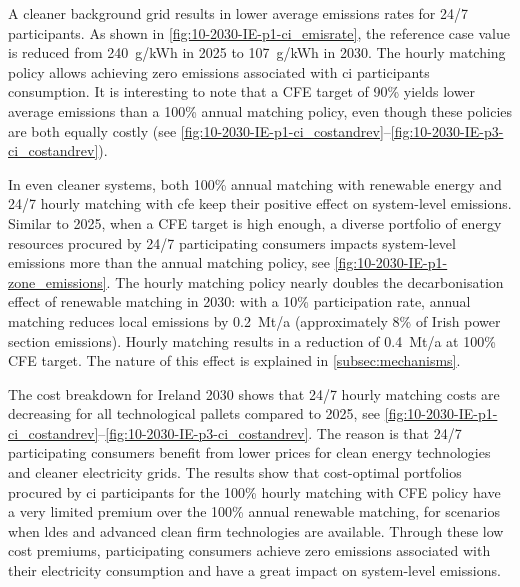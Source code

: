 A cleaner background grid results in lower average emissions rates for 24/7 participants. 
As shown in \cref{fig:10-2030-IE-p1-ci_emisrate}, the reference case value is reduced from 240~g\co/kWh in 2025 to 107~g\co/kWh in 2030.
The hourly matching policy allows achieving zero emissions associated with \gls{ci} participants consumption.
It is interesting to note that a CFE target of 90\% yields lower average emissions than a 100\% annual matching policy, even though these policies are both equally costly (see \cref{fig:10-2030-IE-p1-ci_costandrev}--\cref{fig:10-2030-IE-p3-ci_costandrev}).

In even cleaner systems, both 100\% annual matching with renewable energy and 24/7 hourly matching with \gls{cfe} keep their positive effect on system-level emissions.
Similar to 2025, when a CFE target is high enough, a diverse portfolio of energy resources procured by 24/7 participating consumers impacts system-level emissions more than the annual matching policy, see \cref{fig:10-2030-IE-p1-zone_emissions}.
The hourly matching policy nearly doubles the decarbonisation effect of renewable matching in 2030: with a 10\% participation rate, annual matching reduces local emissions by 0.2~Mt\co/a (approximately 8\% of Irish power section emissions). 
Hourly matching results in a reduction of 0.4~Mt\co/a at 100\% CFE target.
The nature of this effect is explained in \cref{subsec:mechanisms}.

The cost breakdown for Ireland 2030 shows that 24/7 hourly matching costs are decreasing for all technological pallets compared to 2025, see \cref{fig:10-2030-IE-p1-ci_costandrev}--\cref{fig:10-2030-IE-p3-ci_costandrev}.
The reason is that 24/7 participating consumers benefit from lower prices for clean energy technologies and cleaner electricity grids. 
The results show that cost-optimal portfolios procured by \gls{ci} participants for the 100\% hourly matching with CFE policy have a very limited premium over the 100\% annual renewable matching, for scenarios when \gls{ldes} and advanced clean firm technologies are available. 
Through these low cost premiums, participating consumers achieve zero emissions associated with their electricity consumption and have a great impact on system-level \co emissions.


